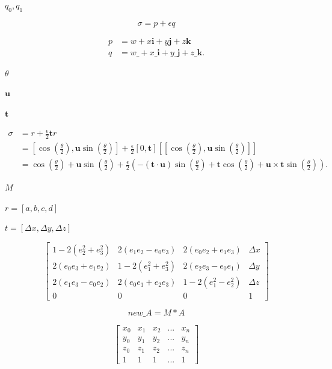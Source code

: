 \documentclass{article}
\begin{document}
$q_0, q_1$
\pagebreak

\[\sigma = p + \epsilon q\]
\pagebreak

\[\begin{equation}
   \begin{split}
   p &= w + x\boldsymbol{i} + y\boldsymbol{j} + z\boldsymbol{k}\\
   q &= w\_ + x\_\boldsymbol{i} + y\_\boldsymbol{j} + z\_\boldsymbol{k}.
   \end{split}
  \end{equation}
\]
\pagebreak

$\theta$
\pagebreak

$\boldsymbol{u}$
\pagebreak

$\boldsymbol{t}$
\pagebreak

\[\begin{equation}
   \begin{split}
   \sigma &= r + \frac{\epsilon}{2}\boldsymbol{t}r \\
          &= [\cos(\frac{\theta}{2}), \boldsymbol{u}\sin(\frac{\theta}{2})]
          + \frac{\epsilon}{2}[0, \boldsymbol{t}][[\cos(\frac{\theta}{2}),
          \boldsymbol{u}\sin(\frac{\theta}{2})]]\\
          &= \cos(\frac{\theta}{2}) + \boldsymbol{u}\sin(\frac{\theta}{2})
          + \frac{\epsilon}{2}(-(\boldsymbol{t} \cdot \boldsymbol{u})\sin(\frac{\theta}{2})
          + \boldsymbol{t}\cos(\frac{\theta}{2}) + \boldsymbol{u} \times \boldsymbol{t} \sin(\frac{\theta}{2})).
   \end{split}
   \end{equation}\]
\pagebreak

$M$
\pagebreak

$r=[a,b,c,d]$
\pagebreak

$t=[\Delta x,\Delta y,\Delta z]$
\pagebreak

\[\begin{bmatrix}
1-2(e_2^2 +e_3^2) &2(e_1e_2-e_0e_3) &2(e_0e_2+e_1e_3) &\Delta x\\
2(e_0e_3+e_1e_2)  &1-2(e_1^2+e_3^2) &2(e_2e_3-e_0e_1) &\Delta y\\
2(e_1e_3-e_0e_2)  &2(e_0e_1+e_2e_3) &1-2(e_1^2-e_2^2) &\Delta z\\
0&0&0&1
\end{bmatrix}
\]
\pagebreak

\[ new\_A = M * A
\]
\pagebreak

\[\begin{bmatrix}
x_0& x_1& x_2&...&x_n\\
y_0& y_1& y_2&...&y_n\\
z_0& z_1& z_2&...&z_n\\
1&1&1&...&1
\end{bmatrix}
\]
\pagebreak
\end{document}

